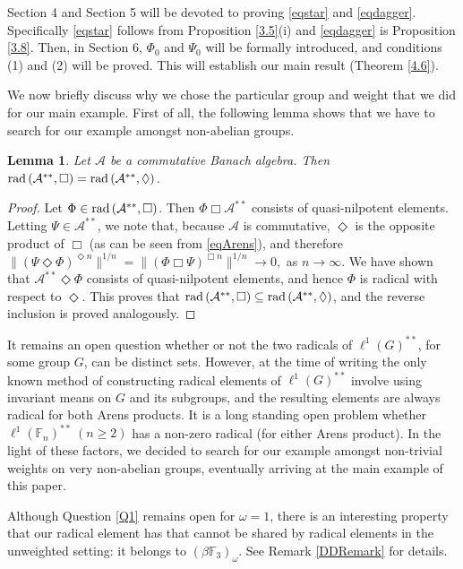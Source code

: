 \documentclass[twoside,11pt]{amsart}
\numberwithin{equation}{section}
\newtheorem{lemma}[theorem]{Lemma}
\theoremstyle{definition}
\newcommand {\A}{\mathcal A}
\newcommand{\rad}{{\rm rad\,}}
\newcommand{\1}{\mathbbm{1}}
\newcommand{\F}{\mathbb F}
\begin{document}
	Section 4 and Section 5 will be devoted to proving \eqref{eqstar} and \eqref{eqdagger}. Specifically \eqref{eqstar} follows from Proposition \ref{3.5}(i) and \eqref{eqdagger} is Proposition \ref{3.8}. Then, in Section 6, $\Phi_0$ and $\Psi_0$ will be formally introduced, and conditions (1) and (2) will be proved. This will establish our main result (Theorem \ref{4.6}). 
	
	We now briefly discuss why we chose the particular group and weight that we did for our main example. First of all, the following lemma shows that we have to search for our example amongst non-abelian groups.
	
	\begin{lemma} 	\label{2.1}
		Let $\A$ be a commutative Banach algebra. Then $\rad(\A^{**}, \Box) = \rad(\A^{**}, \Diamond)$.
	\end{lemma}
	
	\begin{proof}
		Let $\Phi \in \rad( \A^{**}, \Box)$. Then $\Phi \Box \A^{**}$ consists of quasi-nilpotent elements. Letting $\Psi \in \A^{**}$, we note that, because $\A$ is commutative, $\Diamond$ is the opposite product of $\Box$ (as can be seen from \eqref{eqArens}), and therefore
		$\|(\Psi \Diamond \Phi )^{\Diamond n} \|^{1/n} =  \| (\Phi \Box \Psi)^{\Box n} \|^{1/n} \to 0,$
		as $n \to \infty$. We have shown that $\A^{**} \Diamond \Phi$ consists of quasi-nilpotent elements, and hence $\Phi$ is radical with respect to $\Diamond$.		
		This proves that $\rad( \A^{**}, \Box) \subseteq \rad(\A^{**}, \Diamond)$, and the reverse inclusion is proved analogously.
	\end{proof}
	
	It remains an open question whether or not the two radicals of $\ell^1(G)^{**}$, for some group $G$, can be distinct sets. However, at the time of writing the only known method of constructing radical elements of $\ell^1(G)^{**}$ involve using invariant means on $G$ and its subgroups, and the resulting elements are always radical for both Arens products. It is a long standing open problem whether $\ell^1(\F_n)^{**} \ (n \geq 2)$ has a non-zero radical (for either Arens product). In the light of these factors, we decided to search for our example amongst non-trivial weights on very non-abelian groups, eventually arriving at the main example of this paper.  
	
	Although Question \ref{Q1} remains open for $\omega = 1$, there is an interesting property that our radical element has that cannot be shared by radical elements in the unweighted setting: it belongs to  $(\beta \F_3)_\omega$. See Remark \ref{DDRemark} for details.
	
\end{document}
